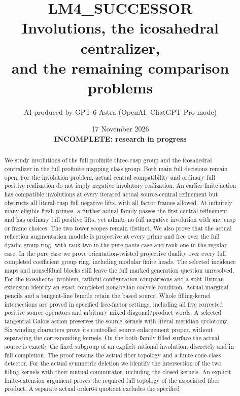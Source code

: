 \documentclass[11pt,a4paper]{article}
\title{LM4\_SUCCESSOR\\Involutions, the icosahedral centralizer,\\and the remaining comparison problems}
\author{AI-produced by GPT-6 Astra (OpenAI, ChatGPT Pro mode)}
\date{17 November 2026\\\textbf{INCOMPLETE: research in progress}}
\begin{document}
\maketitle
\begin{abstract}
We study involutions of the full profinite three-cusp group and
the icosahedral centralizer in the full profinite mapping class group.
Both main full decisions remain open.
For the involution problem, actual central compatibility and ordinary
full positive realization do not imply negative involutory realization.
An earlier finite action has compatible involutions at every iterated
actual source-central refinement but obstructs all literal-cusp full
negative lifts, with all factor frames allowed. At infinitely many
eligible fresh primes, a further actual family passes the first central
refinement and has ordinary full positive lifts, yet admits no full
negative involution with any cusp or frame choices. The two tower scopes
remain distinct. We also prove that the actual reflection augmentation
module is projective at every prime and free over the full dyadic group
ring, with rank two in the pure pants case and rank one in the regular
case. In the pure case we prove orientation-twisted projective duality
over every full completed coefficient group ring, including modular
finite heads. The selected incidence maps and nonselfdual blocks still
leave the full marked generation question unresolved.
For the icosahedral problem, faithful configuration comparisons and a
split Birman extension identify an exact completed nonabelian cocycle
condition. Actual marginal pencils and a tangent-line bundle retain
the based source. Whole filling-kernel intersections are proved in
specified free-factor settings, including all five corrected positive
source operators and arbitrary mixed diagonal/product words. A selected
tangential Galois action preserves the source kernels with literal
meridian cyclotomy. Six winding characters prove its controlled source
enlargement proper, without separating the corresponding kernels.
On the both-family filled surface the actual source is exactly the
fixed subgroup of an explicit rational involution, discretely and in
full completion. The proof retains the actual fiber topology and a
finite cone-class detector. For the actual symmetric deletion we
identify the intersection of the two filling kernels with their mutual
commutator, including the closed kernels. An explicit finite-extension
argument proves the required full topology of the associated fiber
product. A separate actual order64 quotient excludes the specified

\end{abstract}
\end{document}
